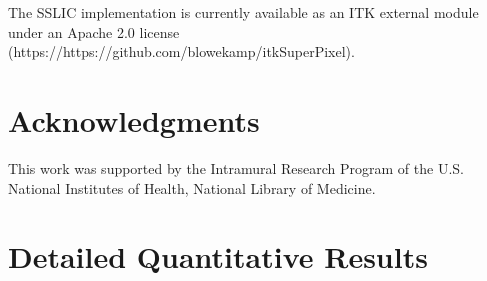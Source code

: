 \documentclass{InsightArticle}
\begin{document}
The SSLIC implementation is currently available as an ITK external module under
an Apache 2.0 license (https://https://github.com/blowekamp/itkSuperPixel).

\section*{Acknowledgments}

This work was supported by the Intramural Research Program of the U.S. National Institutes of Health, National
Library of Medicine.




\appendix
	
\newpage
	
\section{Detailed Quantitative Results}
\end{document}
